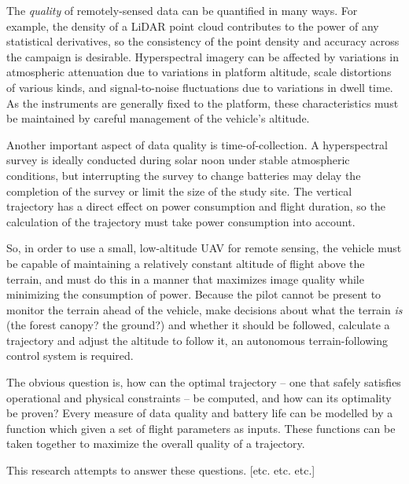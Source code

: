 The \emph{quality} of remotely-sensed data can be quantified in many ways. For example, the density of a LiDAR point cloud contributes to the power of any statistical derivatives, so the consistency of the point density and accuracy across the campaign is desirable. Hyperspectral imagery can be affected by variations in atmospheric attenuation due to variations in platform altitude, scale distortions of various kinds, and signal-to-noise fluctuations due to variations in dwell time. As the instruments are generally fixed to the platform, these characteristics must be maintained by careful management of the vehicle's altitude.

Another important aspect of data quality is time-of-collection. A hyperspectral survey is ideally conducted during solar noon under stable atmospheric conditions, but interrupting the survey to change batteries may delay the completion of the survey or limit the size of the study site. The vertical trajectory has a direct effect on power consumption and flight duration, so the calculation of the trajectory must take power consumption into account.

So, in order to use a small, low-altitude UAV for remote sensing, the vehicle must be capable of maintaining a relatively constant altitude of flight above the terrain, and must do this in a manner that maximizes image quality while minimizing the consumption of power. Because the pilot cannot be present to monitor the terrain ahead of the vehicle, make decisions about what the terrain \emph{is} (the forest canopy? the ground?) and whether it should be followed, calculate a trajectory and adjust the altitude to follow it, an autonomous terrain-following control system is required.

The obvious question is, how can the optimal trajectory -- one that safely satisfies operational and physical constraints -- be computed, and how can its optimality be proven? Every measure of data quality and battery life can be modelled by a function which given a set of flight parameters as inputs. These functions can be taken together to maximize the overall quality of a trajectory.

This research attempts to answer these questions. [etc. etc. etc.]